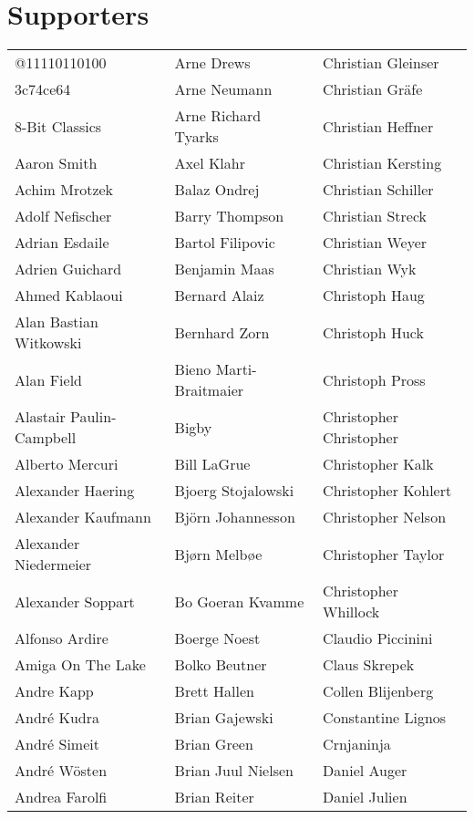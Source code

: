 \newpage
\section{Supporters}

\begin{small}
\setlength{\tabcolsep}{1mm}
\begin{tabular}{p{4cm}p{4cm}p{4cm}}
@11110110100 & Arne Drews & Christian Gleinser \\
3c74ce64 & Arne Neumann & Christian Gräfe \\
8-Bit Classics & Arne Richard Tyarks & Christian Heffner \\
Aaron Smith & Axel Klahr & Christian Kersting \\
Achim Mrotzek & Balaz Ondrej & Christian Schiller \\
Adolf Nefischer & Barry Thompson & Christian Streck \\
Adrian Esdaile & Bartol Filipovic & Christian Weyer \\
Adrien Guichard & Benjamin Maas & Christian Wyk \\
Ahmed Kablaoui & Bernard Alaiz & Christoph Haug \\
Alan Bastian Witkowski & Bernhard Zorn & Christoph Huck \\
Alan Field & Bieno Marti-Braitmaier & Christoph Pross \\
Alastair Paulin-Campbell & Bigby & Christopher Christopher \\
Alberto Mercuri & Bill LaGrue & Christopher Kalk \\
Alexander Haering & Bjoerg Stojalowski & Christopher Kohlert \\
Alexander Kaufmann & Björn Johannesson & Christopher Nelson \\
Alexander Niedermeier & Bjørn Melbøe & Christopher Taylor \\
Alexander Soppart & Bo Goeran Kvamme & Christopher Whillock \\
Alfonso Ardire & Boerge Noest & Claudio Piccinini \\
Amiga On The Lake & Bolko Beutner & Claus Skrepek \\
Andre Kapp & Brett Hallen & Collen Blijenberg \\
André Kudra & Brian Gajewski & Constantine Lignos \\
André Simeit & Brian Green & Crnjaninja \\
André Wösten & Brian Juul Nielsen & Daniel Auger \\
Andrea Farolfi & Brian Reiter & Daniel Julien \\

\end{tabular}
\end{small}
